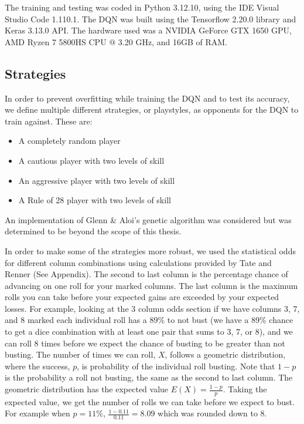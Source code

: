 \documentclass[12pt]{article}
\begin{document}
\begin{thesis}
The training and testing was coded in Python 3.12.10, using the IDE Visual Studio Code 1.110.1. The DQN was built using the Tensorflow 2.20.0 library and Keras 3.13.0 API. The hardware used was a NVIDIA GeForce GTX 1650 GPU, AMD Ryzen 7 5800HS CPU @ 3.20 GHz, and 16GB of RAM.

\subsection{Strategies}\label{strategies}

In order to prevent overfitting while training the DQN and to test its accuracy, we define multiple different strategies, or playstyles, as opponents for the DQN to train against.
These are:

\begin{itemize}
\item
  A completely random player
\item
  A cautious player with two levels of skill
\item
  An aggressive player with two levels of skill
\item
  A Rule of 28 player with two levels of skill
\end{itemize}

An implementation of Glenn \& Aloi's genetic algorithm was considered but was determined to be beyond the scope of this thesis.

In order to make some of the strategies more robust, we used the statistical odds for different column combinations using calculations provided by Tate and Renner (See Appendix). The second to last column is the percentage chance of advancing on one roll for your marked columns. The last column is the maximum rolls you can take before your expected gains are exceeded by your expected losses. For example, looking at the 3 column odds section if we have columns 3, 7, and 8 marked each individual roll has a 89\% to not bust (we have a 89\% chance to get a dice combination with at least one pair that sums to 3, 7, or 8), and we can roll 8 times before we expect the chance of busting to be greater than not busting. The number of times we can roll, \(X\), follows a geometric distribution, where the success, \(p\), is probability of the individual roll busting. Note that \(1-p\) is the probability a roll not busting, the same as the second to last column. The geometric distribution has the expected value \(E(X)=\frac{1-p}{p}\). Taking the expected value, we get the number of rolls we can take before we expect to bust. For example when \(p=11\%\), \(\frac{1-0.11}{0.11}=8.09\) which was rounded down to 8.


\end{thesis}
\end{document}
